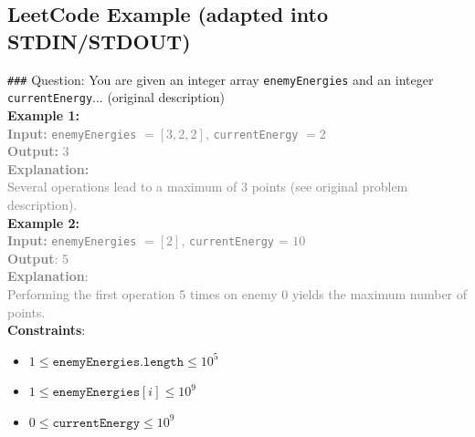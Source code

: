\documentclass{article} %
\begin{document}
\subsection{LeetCode Example (adapted into STDIN/STDOUT)}
\label{app_leetcode_prompts}

\begin{origtext}
\texttt{\#\#\#} Question:  
You are given an integer array \texttt{enemyEnergies} and an integer \texttt{currentEnergy}... (original description)
\\

\textbf{Example 1:}  \\
\textcolor{gray}{
\textbf{Input:} \texttt{enemyEnergies} $ = [3,2,2]$, \texttt{currentEnergy} $ = 2$  \\
\textbf{Output:} $3$  \\
\textbf{Explanation:}  \\
Several operations lead to a maximum of $3$ points (see original problem description).
}
\\

\textbf{Example 2:}  \\
\textcolor{gray}{
\textbf{Input:} \texttt{enemyEnergies} $= [2]$, \texttt{currentEnergy} = $10$  \\
\textbf{Output}: 5  \\
\textbf{Explanation}:  \\
Performing the first operation 5 times on enemy 0 yields the maximum number of points. }
\\

\textbf{Constraints}:  
\begin{itemize}
    \item $1 \leq \texttt{enemyEnergies.length} \leq 10^5$
    \item $1 \leq \texttt{enemyEnergies}[i] \leq 10^9 $
    \item $0 \leq \texttt{currentEnergy} \leq 10^9$
\end{itemize}
\end{origtext}
\end{document}
